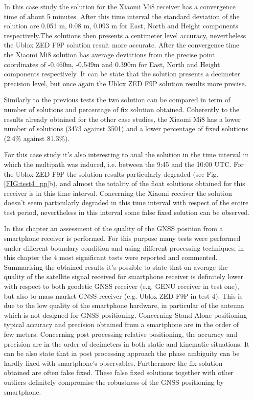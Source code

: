 In this case study the solution for the Xiaomi Mi8 receiver has a convergence time of about 5 minutes. After this time interval the standard deviation of the solution are 0.051 m, 0.08 m, 0.093 m for East, North and Height components respectively.The solutions then presents a centimeter level accuracy, nevertheless the Ublox ZED F9P solution result more accurate. After the convergence time the Xiaomi Mi8 solution has average deviations from the precise point coordinates of -0.460m, -0.549m and 0.390m for East, North and Height components respectively. It can be state that the solution presents a decimeter precision level, but once again the Ublox ZED F9P solution results more precise.

Similarly to the previous tests the two solution can be compared in term of number of solutions and percentage of fix solution obtained. Coherently to the results already obtained for the other case studies, the Xiaomi Mi8 has a lower number of solutions (3473 against 3501) and a lower percentage of fixed solutions (2.4\% against 81.3\%).

For this case study it's also interesting to anal the solution in the time interval in which the multipath was induced, i.e. between the 9:45 and the 10:00 UTC. For the Ublox ZED F9P the solution results particularly degraded (see Fig. \ref{FIG:test4_pp}b), and almost the totality of the float solutions obtained for this receiver is in this time interval. Concerning the Xiaomi receiver the solution doesn't seem particularly degraded in this time interval with respect of the entire test period, nevertheless in this interval some false fixed solution can be observed. 

In this chapter an assessment of the quality of the GNSS position from a smartphone receiver is performed. For this purpose many tests were performed under different boundary condition and using different processing techniques, in this chapter the 4 most significant tests were reported and commented. Summarising the obtained results it's possible to state that on average the quality of the satellite signal received for smartphone receiver is definitely lower with respect to both geodetic GNSS receiver (e.g. GENU receiver in test one), but also to mass market GNSS receiver (e.g. Ublox ZED F9P in test 4). This is due to the low quality of the smartphone hardware, in particular of the antenna which is not designed for GNSS positioning. Concerning Stand Alone positioning typical accuracy and precision obtained from a smartphone are in the order of few meters. Concerning post processing relative positioning, the accuracy and precision are in the order of decimeters in both static and kinematic situations. It can be also state that in post processing approach the phase ambiguity can be hardly fixed with smartphone's observables. Furthermore the fix solution obtained are often false fixed. These false fixed solutions together with other outliers definitely compromise the robustness of the GNSS positioning by smartphone. 